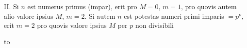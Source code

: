 \par II. Si $n$ est numerus primus (impar), erit pro $M=0$, $m=1$, pro quovis autem alio valore ipsius $M$, $m=2$. Si autem $n$ est potestas numeri primi imparis $=p^\nu$, erit $m=2$ pro quovis valore ipsius $M$ per $p$ non divisibili\quad\textemdash
\par\nobreak\noindent\hbox to\linewidth{\textemdash\hfil\textemdash\hfil\textemdash\hfil\textemdash\hfil\textemdash\hfil\textemdash\hfil\textemdash\hfil\textemdash\hfil\textemdash\hfil\textemdash\hfil\textemdash\hfil\textemdash\hfil\textemdash\hfil\textemdash\hfil\textemdash\hfil\textemdash\hfil\textemdash}\par
